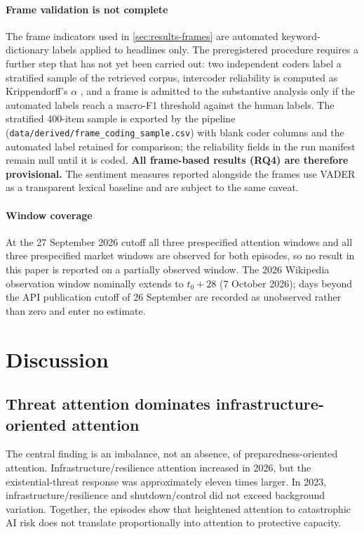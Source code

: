 \elsevierclasstrue\documentclass[preprint,12pt]{elsarticle}%
\begin{document}
\paragraph{Frame validation is not complete} The frame indicators used in \cref{sec:results-frames} are automated keyword-dictionary labels applied to headlines only. The preregistered procedure requires a further step that has not yet been carried out: two independent coders label a stratified sample of the retrieved corpus, intercoder reliability is computed as Krippendorff's \(\alpha\) \citep{krippendorff2018content}, and a frame is admitted to the substantive analysis only if the automated labels reach a macro-F1 threshold against the human labels. The stratified 400-item sample is exported by the pipeline (\texttt{data/derived/frame\_coding\_sample.csv}) with blank coder columns and the automated label retained for comparison; the reliability fields in the run manifest remain null until it is coded. \textbf{All frame-based results (RQ4) are therefore provisional.} The sentiment measures reported alongside the frames use VADER \citep{hutto2014vader} as a transparent lexical baseline and are subject to the same caveat.

\paragraph{Window coverage} At the 27 September 2026 cutoff all three prespecified attention windows and all three prespecified market windows are observed for both episodes, so no result in this paper is reported on a partially observed window. The 2026 Wikipedia observation window nominally extends to $t_0+28$ (7 October 2026); days beyond the API publication cutoff of 26 September are recorded as unobserved rather than zero and enter no estimate.


\section{Discussion}

\subsection{Threat attention dominates infrastructure-oriented attention}

The central finding is an imbalance, not an absence, of preparedness-oriented attention. Infrastructure/resilience attention increased in 2026, but the existential-threat response was approximately eleven times larger. In 2023, infrastructure/resilience and shutdown/control did not exceed background variation. Together, the episodes show that heightened attention to catastrophic AI risk does not translate proportionally into attention to protective capacity.
\end{document}
